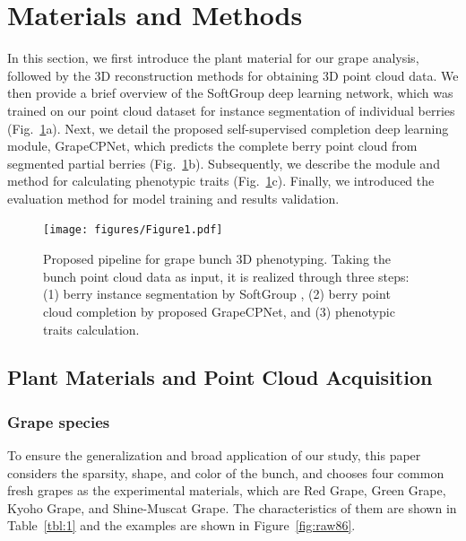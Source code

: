\documentclass[12pt]{article}
\begin{document}
\section{Materials and Methods}

In this section, we first introduce the plant material for our grape analysis, followed by the 3D reconstruction methods for obtaining 3D point cloud data. 
We then provide a brief overview of the SoftGroup \citep{vu_softgroup_2022} deep learning network, which was trained on our point cloud dataset for instance segmentation of individual berries (Fig.~\ref{fig:raw1}a). 
Next, we detail the proposed self-supervised completion deep learning module, GrapeCPNet, which predicts the complete berry point cloud from segmented partial berries (Fig.~\ref{fig:raw1}b). 
Subsequently, we describe the module and method for calculating phenotypic traits (Fig.~\ref{fig:raw1}c). 
Finally, we introduced the evaluation method for model training and results validation.

\begin{figure}[hbt!]
    \centering
    \texttt{[image: figures/Figure1.pdf]}
    \caption{Proposed pipeline for grape bunch 3D phenotyping. Taking the bunch point cloud data as input, it is realized through three steps: (1) berry instance segmentation by SoftGroup \citep{vu_softgroup_2022}, (2) berry point cloud completion by proposed GrapeCPNet, and (3) phenotypic traits calculation.}
    \label{fig:raw1}
\end{figure}

\subsection{Plant Materials and Point Cloud Acquisition}

\subsubsection{Grape species}

To ensure the generalization and broad application of our study, this paper considers the sparsity, shape, and color of the bunch, and chooses four common fresh grapes as the experimental materials, which are Red Grape, Green Grape, Kyoho Grape, and Shine-Muscat Grape. 
The characteristics of them are shown in Table~\ref{tbl:1} and the examples are shown in Figure~\ref{fig:raw86}.
\end{document}
